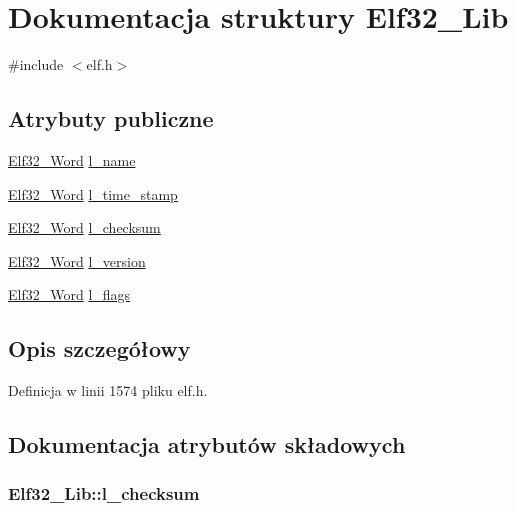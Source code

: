 \hypertarget{struct_elf32___lib}{\section{Dokumentacja struktury Elf32\-\_\-\-Lib}
\label{struct_elf32___lib}
}


{\ttfamily \#include $<$elf.\-h$>$}

\subsection*{Atrybuty publiczne}
\begin{DoxyCompactItemize}
\item 
\hyperlink{elf_8h_af5924ece606c732e86f8263a19408e45}{Elf32\-\_\-\-Word} \hyperlink{struct_elf32___lib_af40827a2882aaf96d42ae60dac6551ee}{l\-\_\-name}
\item 
\hyperlink{elf_8h_af5924ece606c732e86f8263a19408e45}{Elf32\-\_\-\-Word} \hyperlink{struct_elf32___lib_ae7119079569dcf7ecebccc47cb6350be}{l\-\_\-time\-\_\-stamp}
\item 
\hyperlink{elf_8h_af5924ece606c732e86f8263a19408e45}{Elf32\-\_\-\-Word} \hyperlink{struct_elf32___lib_a290248b0a3cecff9d43f796dd5c50b12}{l\-\_\-checksum}
\item 
\hyperlink{elf_8h_af5924ece606c732e86f8263a19408e45}{Elf32\-\_\-\-Word} \hyperlink{struct_elf32___lib_ab1be8296800ef7b233adb56f1cfb901c}{l\-\_\-version}
\item 
\hyperlink{elf_8h_af5924ece606c732e86f8263a19408e45}{Elf32\-\_\-\-Word} \hyperlink{struct_elf32___lib_a4a0feb8162591596d3653f561ee8759e}{l\-\_\-flags}
\end{DoxyCompactItemize}


\subsection{Opis szczegółowy}


Definicja w linii 1574 pliku elf.\-h.



\subsection{Dokumentacja atrybutów składowych}
\hypertarget{struct_elf32___lib_a290248b0a3cecff9d43f796dd5c50b12}{
\subsubsection[{l\-\_\-checksum}]{ Elf32\-\_\-\-Lib\-::l\-\_\-checksum}}\label{struct_elf32___lib_a290248b0a3cecff9d43f796dd5c50b12}


